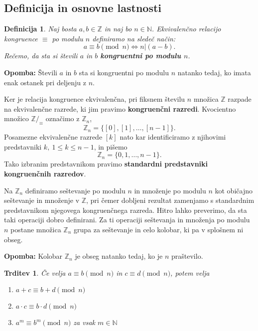 \documentclass[12pt, a4paper]{article}
\newtheorem{defi}{Definicija}
\newtheorem{trd}{Trditev}
\newenvironment{opom}[1][]{\par\medskip\noindent \textbf{Opomba: }}{\medskip}
\begin{document}
\subsection{Definicija in osnovne lastnosti}

\begin{defi}
Naj bosta $a,b\in \mathbb{Z}$ in naj bo $n \in \mathbb{N}$. Ekvivalenčno relacijo kongruence $\equiv$ po modulu $n$ definiramo na sledeč način:
$$a\equiv b \pmod n \iff n|(a-b).$$
Rečemo, da sta si števili $a$ in $b$ \textbf{kongruentni po modulu $n$}.
\end{defi}

\begin{opom}
Števili $a$ in $b$ sta si kongruentni po modulu $n$ natanko tedaj, ko imata enak ostanek pri deljenju z $n$.
\end{opom}

Ker je relacija kongruence ekvivalenčna, pri fiksnem številu $n$ množica $\mathbb{Z}$ razpade na ekvivalenčne razrede, ki jim pravimo \textbf{kongruenčni razredi}. Kvocientno množico $\mathbb{Z}/_{\equiv}$ označimo z $\mathbb{Z}_{n}$,
$$\mathbb{Z}_{n} = \{[0], [1],\dots,[n-1]\}.$$
Posamezne ekvivalenčne razrede $[k]$ nato kar identificiramo z njihovimi predstavniki $k, \ 1\leq k \leq n-1$, in pišemo
$$\mathbb{Z}_{n} = \{0, 1,\dots,n-1\}.$$
Tako izbranim predstavnikom pravimo \textbf{standardni predstavniki kongruenčnih razredov}.

Na $\mathbb{Z}_{n}$ definiramo seštevanje po modulu $n$ in množenje po modulu $n$ kot običajno seštevanje in množenje v $\mathbb{Z}$, pri čemer dobljeni rezultat zamenjamo s standardnim predstavnikom njegovega kongruenčnega razreda. Hitro lahko preverimo, da sta taki operaciji dobro definirani. Za ti operaciji seštevanja in množenja po modulu $n$ postane množica $\mathbb{Z}_{n}$ grupa za seštevanje in celo kolobar, ki pa v splošnem ni obseg.

\begin{opom}
Kolobar $\mathbb{Z}_{n}$ je obseg natanko tedaj, ko je $n$ praštevilo.
\end{opom}

\begin{trd}
Če velja $a\equiv b \pmod n$ in $c\equiv d \pmod n$, potem velja
\begin{enumerate}
\item $a+c\equiv b+d \pmod n$
\item $a\cdot c\equiv b\cdot d \pmod n$
\item $a^{m}\equiv b^{m} \pmod n$ za vsak $m\in \mathbb{N}$
\end{enumerate}
\end{trd}
\end{document}
